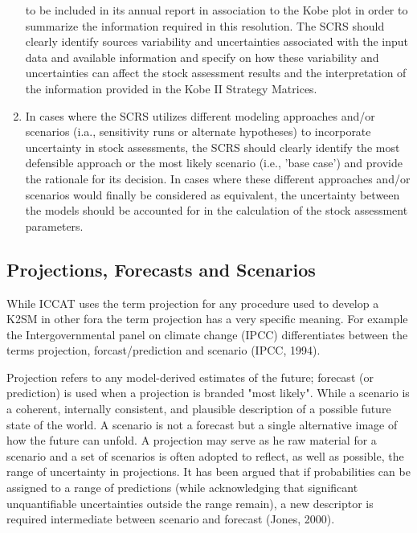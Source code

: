 \documentclass[a4paper,10pt]{article}
\begin{document}
\begin{enumerate}
        to be included in its annual report in association to the Kobe plot in order to summarize the information required 
        in this resolution.
        The SCRS should clearly identify sources variability and uncertainties associated with the input data and available 
        information and specify on how these variability and uncertainties can affect the stock assessment results and the  
        interpretation of the information provided in the Kobe II Strategy Matrices. 
  \item In cases where the SCRS utilizes different modeling approaches and/or scenarios (i.a., sensitivity runs or 
        alternate hypotheses) to incorporate uncertainty in stock assessments, the SCRS should clearly identify the most 
        defensible approach or the most likely scenario (i.e., 'base case') and provide the rationale for its decision.
        In cases where these different approaches and/or scenarios would finally be considered as equivalent, the uncertainty 
        between the models should be accounted for in the calculation of the stock assessment parameters. 
\end{enumerate}
 

\subsection*{Projections, Forecasts and Scenarios}

While ICCAT uses the term projection for any procedure used to develop a K2SM in other fora the term projection has a
very specific meaning. For example the Intergovernmental panel on climate change (IPCC) differentiates between the terms projection,
forcast/prediction and scenario (IPCC, 1994). 

Projection refers to any model-derived estimates of the future; forecast (or prediction) is used when a projection is branded "most likely". 
While a scenario is a coherent, internally consistent, and plausible description of a possible future state of 
the world. A scenario is not a forecast but a single alternative image of how the future can unfold. 
A projection may serve as he raw material for a scenario and a set of scenarios is often adopted to reflect, as well as possible, 
the range of uncertainty in projections. It has been argued that if probabilities can be assigned 
to a range of predictions (while acknowledging that significant unquantifiable uncertainties outside the range remain), 
a new descriptor is required intermediate between scenario and forecast (Jones, 2000).
\end{document}
